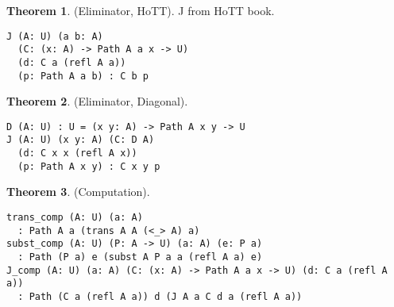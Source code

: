 \documentclass{article}
\theoremstyle{definition}
\newtheorem{theorem}{Theorem}
\begin{document}
\begin{theorem} (Eliminator, HoTT).
J from HoTT book.
\begin{lstlisting}
J (A: U) (a b: A)
  (C: (x: A) -> Path A a x -> U)
  (d: C a (refl A a))
  (p: Path A a b) : C b p
\end{lstlisting}
\end{theorem}

\begin{theorem} (Eliminator, Diagonal).
\begin{lstlisting}
D (A: U) : U = (x y: A) -> Path A x y -> U
J (A: U) (x y: A) (C: D A)
  (d: C x x (refl A x))
  (p: Path A x y) : C x y p
\end{lstlisting}
\end{theorem}

\begin{theorem} (Computation).
\begin{lstlisting}
trans_comp (A: U) (a: A)
  : Path A a (trans A A (<_> A) a)
subst_comp (A: U) (P: A -> U) (a: A) (e: P a)
  : Path (P a) e (subst A P a a (refl A a) e)
J_comp (A: U) (a: A) (C: (x: A) -> Path A a x -> U) (d: C a (refl A a))
  : Path (C a (refl A a)) d (J A a C d a (refl A a))
\end{lstlisting}
\end{theorem}

\end{document}
